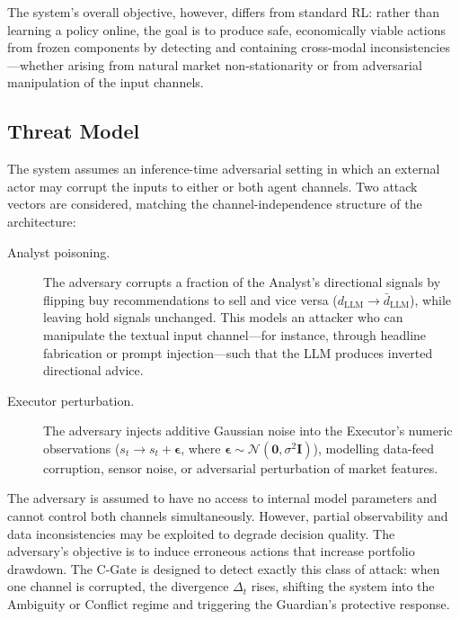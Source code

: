 The system's overall objective, however, differs from standard RL: rather
than learning a policy online, the goal is to produce safe, economically
viable actions from frozen components by detecting and containing
cross-modal inconsistencies---whether arising from natural market
non-stationarity or from adversarial manipulation of the input channels.


\subsection{Threat Model}
\label{sec:threat-model}

The system assumes an inference-time adversarial setting in which an external
actor may corrupt the inputs to either or both agent channels. Two attack
vectors are considered, matching the channel-independence structure of the
architecture:

\begin{description}
  \item[Analyst poisoning.] The adversary corrupts a fraction of the
    Analyst's directional signals by flipping buy recommendations to sell
    and vice versa ($d_{\mathrm{LLM}} \rightarrow \bar{d}_{\mathrm{LLM}}$),
    while leaving hold signals unchanged. This models an attacker who can
    manipulate the textual input channel---for instance, through headline
    fabrication or prompt injection---such that the LLM produces inverted
    directional advice.
  \item[Executor perturbation.] The adversary injects additive Gaussian
    noise into the Executor's numeric observations
    ($s_t \rightarrow s_t + \boldsymbol{\epsilon}$, where
    $\boldsymbol{\epsilon} \sim \mathcal{N}(\mathbf{0}, \sigma^2 \mathbf{I})$),
    modelling data-feed corruption, sensor noise, or adversarial
    perturbation of market features.
\end{description}

The adversary is assumed to have no access to internal model parameters and
cannot control both channels simultaneously. However, partial observability
and data inconsistencies may be exploited to degrade decision quality. The
adversary's objective is to induce erroneous actions that increase portfolio
drawdown. The C-Gate is designed to detect exactly this class of attack: when
one channel is corrupted, the divergence $\Delta_t$ rises, shifting the
system into the Ambiguity or Conflict regime and triggering the Guardian's
protective response.

